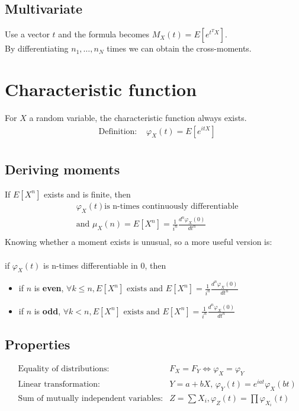 \documentclass[../main.tex]{subfiles}
\begin{document}
\subsection{Multivariate}
Use a vector $t$ and the formula becomes $M_X(t) = E[e^{t^TX}]$. \\
By differentiating $n_1, \dots, n_N$ times we can obtain the cross-moments.

\section{Characteristic function}
For $X$ a random variable, the characteristic function always exists.
\begin{align*}
    &\text{Definition: }&\varphi_X(t) = E[e^{itX}] \\
\end{align*}
\subsection{Deriving moments}
If $E[X^n]$ exists and is finite, then
\begin{align*}
    &\varphi_X(t)\text{is n-times continuously differentiable}\\
    &\text{and }\mu_X(n) = E[X^n] = \frac{1}{i^n}\frac{d^n\varphi_X(0)}{dt^n}  \\
\end{align*}
Knowing whether a moment exists is unusual, so a more useful version is: \\
\\
if $\varphi_X(t)$ is n-times differentiable in 0, then
\begin{itemize}
    \item if $n$ is \textbf{even}, $\forall k \leq n, E[X^n]\text{ exists and } E[X^n] = \frac{1}{i^n}\frac{d^n\varphi_X(0)}{dt^n} $
    \item if $n$ is \textbf{odd}, $\forall k < n, E[X^n]\text{ exists and } E[X^n] = \frac{1}{i^n}\frac{d^n\varphi_X(0)}{dt^n} $
\end{itemize}
\subsection{Properties}
\begin{align*}
    &\text{Equality of distributions: }& F_X = F_Y \Longleftrightarrow \varphi_X = \varphi_Y \\
    &\text{Linear transformation: }& Y = a + bX, \, \varphi_Y(t) = e^{iat}\varphi_X(bt) \\
    &\text{Sum of mutually independent variables:}& Z =\sum{X_i}, \varphi_Z(t) = \prod{\varphi_{X_i}(t)}
\end{align*}
\end{document}
